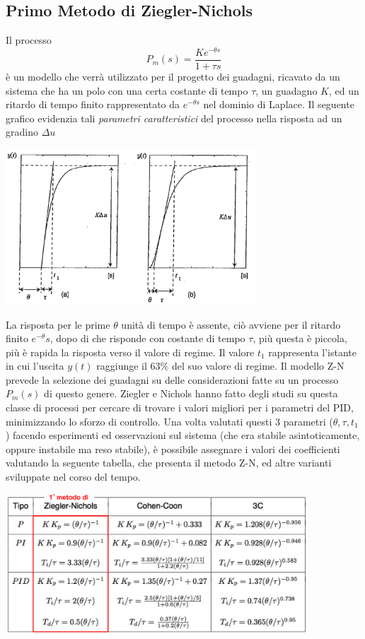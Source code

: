 \documentclass[10pt, letterpaper]{report}
\begin{document}
\subsection{Primo Metodo di Ziegler-Nichols}
Il processo 
$$ P_m(s)=\frac{Ke^{-\theta s}}{1+\tau s}$$
è un modello che verrà utilizzato per il progetto dei guadagni, ricavato da un sistema che ha un polo con una certa costante di tempo $\tau$, un guadagno $K$, ed un ritardo di tempo finito rappresentato da $e^{-\theta s}$ nel dominio di Laplace. Il seguente grafico evidenzia tali \textit{parametri caratteristici} del processo nella risposta ad un gradino 
$\Delta u$
\begin{center}
    \includegraphics[width=0.7\textwidth]{images/tuning1.png}
\end{center}
La risposta per le prime $\theta $ unità di tempo è assente, ciò avviene per il ritardo finito $e^{-\theta}s$, dopo di che risponde con costante di tempo $\tau$, più questa è piccola, più è rapida la risposta verso il valore di regime.\acc 
Il valore $t_1$ rappresenta l'istante in cui l'uscita $y(t)$ raggiunge il $63\%$ del suo valore di regime.\acc 
Il modello Z-N prevede la selezione dei guadagni su delle considerazioni fatte su un processo $P_m(s)$ di questo genere.  Ziegler e Nichols hanno fatto degli studi su questa classe di processi per cercare di trovare i valori migliori per i parametri del PID, minimizzando lo sforzo di controllo.\acc 
Una volta valutati questi 3 parametri ($\theta,\tau,t_1$) facendo esperimenti ed osservazioni sul sistema (che era stabile asintoticamente, oppure instabile ma reso stabile), è possibile assegnare i valori dei coefficienti valutando la seguente tabella, che presenta il metodo Z-N, ed altre varianti sviluppate nel corso del tempo.\begin{center}
    \includegraphics[width=0.85\textwidth]{images/ZN.png}
\end{center}
\end{document}
